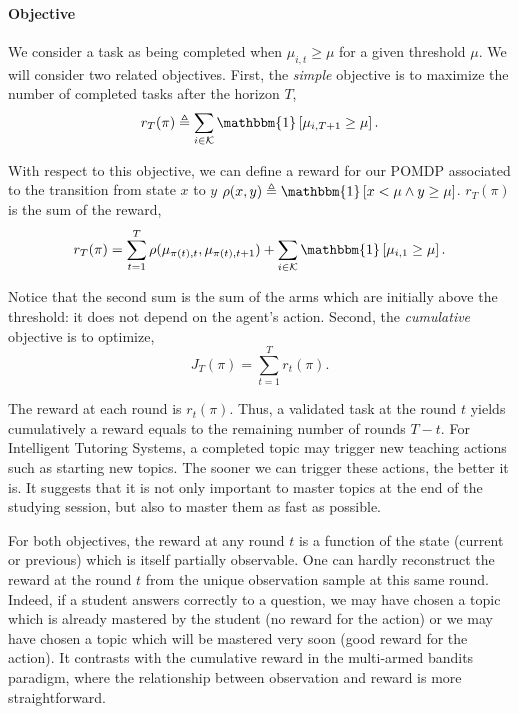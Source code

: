 \paragraph{Objective}
We consider a task as being completed when
$\mu_{i,t} \geq \mu$ for a given threshold $\mu$. We will consider two related objectives. First, the \textit{simple} objective is to maximize the number of completed tasks after the horizon $T$, 
\[
r_T(\pi) \triangleq \sum_{i \in \arms} \mathbbm{1}\left[\mu_{i,T+1} \geq \mu \right].
\]

With respect to this objective, we can define a reward for our POMDP associated to the transition from state $x$ to $y$ $\rho(x, y) \triangleq \mathbbm{1}\left[x<\mu \land y \geq \mu\right]$. $r_T(\pi)$ is the sum of the reward,
\begin{equation}
\label{eq:link-r-rho}
r_T(\pi) = \sum_{t=1}^T \rho(\mu_{\pi(t), t},\mu_{\pi(t), t+1}) + \sum_{i\in \arms} \mathbbm{1}\left[\mu_{i,1} \geq \mu \right].
\end{equation}

Notice that the second sum is the sum of the arms which are initially above the threshold: it does not depend on the agent's action. Second, the \textit{cumulative} objective is to optimize,
\[
J_T(\pi) = \sum_{t=1}^T r_t(\pi).
\]

The reward at each round is $r_t(\pi)$. Thus, a validated task at the round $t$ yields cumulatively a reward equals to the remaining number of rounds $T-t$. For Intelligent Tutoring Systems, a completed topic may trigger new teaching actions such as starting new topics. The sooner we can trigger these actions, the better it is. It suggests that it is not only important to master topics at the end of the studying session, but also to master them as fast as possible. 

\begin{remark}
For both objectives, the reward at any round $t$ is a function of the state (current or previous) which is itself partially observable. One can hardly reconstruct the reward at the round $t$ from the unique observation sample at this same round. Indeed, if a student answers correctly to a question, we may have chosen a topic which is already mastered by the student (no reward for the action) or we may have chosen a topic which will be mastered very soon (good reward for the action). It contrasts with the cumulative reward in the multi-armed bandits paradigm, where the relationship between observation and reward is more straightforward.
\end{remark}

